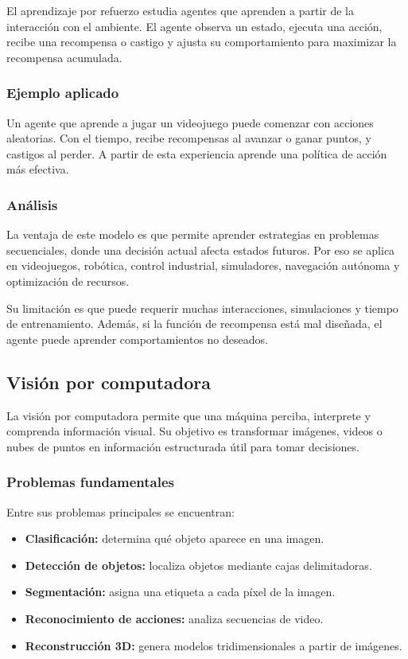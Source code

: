 El aprendizaje por refuerzo estudia agentes que aprenden a partir de la interacción con el ambiente. El agente observa un estado, ejecuta una acción, recibe una recompensa o castigo y ajusta su comportamiento para maximizar la recompensa acumulada.

\subsubsection{Ejemplo aplicado}

Un agente que aprende a jugar un videojuego puede comenzar con acciones aleatorias. Con el tiempo, recibe recompensas al avanzar o ganar puntos, y castigos al perder. A partir de esta experiencia aprende una política de acción más efectiva.

\subsubsection{Análisis}

La ventaja de este modelo es que permite aprender estrategias en problemas secuenciales, donde una decisión actual afecta estados futuros. Por eso se aplica en videojuegos, robótica, control industrial, simuladores, navegación autónoma y optimización de recursos.

Su limitación es que puede requerir muchas interacciones, simulaciones y tiempo de entrenamiento. Además, si la función de recompensa está mal diseñada, el agente puede aprender comportamientos no deseados.

\subsection{Visión por computadora}

La visión por computadora permite que una máquina perciba, interprete y comprenda información visual. Su objetivo es transformar imágenes, videos o nubes de puntos en información estructurada útil para tomar decisiones.

\subsubsection{Problemas fundamentales}

Entre sus problemas principales se encuentran:

\begin{itemize}
    \item \textbf{Clasificación:} determina qué objeto aparece en una imagen.
    \item \textbf{Detección de objetos:} localiza objetos mediante cajas delimitadoras.
    \item \textbf{Segmentación:} asigna una etiqueta a cada píxel de la imagen.
    \item \textbf{Reconocimiento de acciones:} analiza secuencias de video.
    \item \textbf{Reconstrucción 3D:} genera modelos tridimensionales a partir de imágenes.
\end{itemize}

